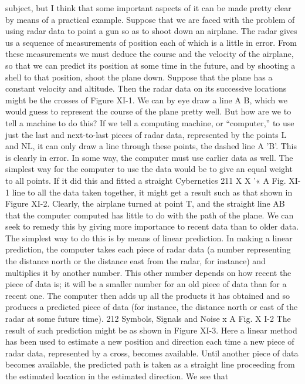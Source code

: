 {{{{{{{{{{{subject, but I think that some important aspects of it can be made
pretty clear by means of a practical example.
Suppose that we are faced with the problem of using radar data
to point a gun so as to shoot down an airplane. The radar gives
us a sequence of measurements of position each of which is a little
in error. From these measurements we must deduce the course and
the velocity of the airplane, so that we can predict its position at
some time in the future, and by shooting a shell to that position,
shoot the plane down.
Suppose that the plane has a constant velocity and altitude.
Then the radar data on its successive locations might be the crosses
of Figure XI-1. We can by eye draw a line A B, which we would
guess to represent the course of the plane pretty well. But how are
we to tell a machine to do this?
If we tell a computing machine, or “computer,” to use just the
last and next-to-last pieces of radar data, represented by the points
L and NL, it can only draw a line through these points, the dashed
line A 'B'. This is clearly in error. In some way, the computer must
use earlier data as well.
The simplest way for the computer to use the data would be to
give an equal weight to all points. If it did this and fitted a straight
Cybernetics 211
X X '«
A
Fig. XI-1
line to all the data taken together, it might get a result such as that
shown in Figure XI-2. Clearly, the airplane turned at point T, and
the straight line AB that the computer computed has little to do
with the path of the plane.
We can seek to remedy this by giving more importance to recent
data than to older data. The simplest way to do this is by means
of linear prediction. In making a linear prediction, the computer
takes each piece of radar data (a number representing the distance
north or the distance east from the radar, for instance) and multiplies
it by another number. This other number depends on how
recent the piece of data is; it will be a smaller number for an old
piece of data than for a recent one. The computer then adds up
all the products it has obtained and so produces a predicted piece
of data (for instance, the distance north or east of the radar at some
future time).
212 Symbols, Signals and Noise
x
A
Fig. X I-2
The result of such prediction might be as shown in Figure XI-3.
Here a linear method has been used to estimate a new position and
direction each time a new piece of radar data, represented by a
cross, becomes available. Until another piece of data becomes
available, the predicted path is taken as a straight line proceeding
from the estimated location in the estimated direction. We see that
}}}}}}}}}}}
